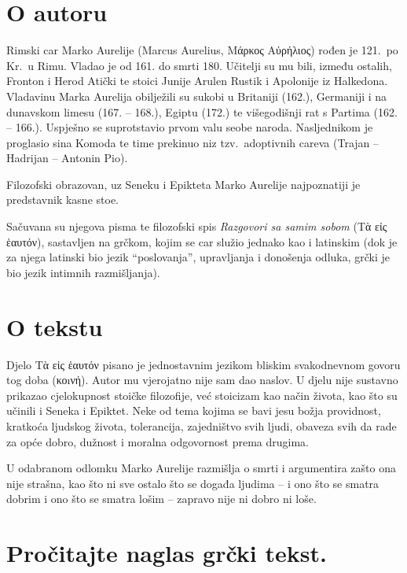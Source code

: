 \section*{O autoru}

Rimski car Marko Aurelije (Marcus Aurelius, \textgreek[variant=ancient]{Μάρκος Αὐρήλιος}) rođen je 121.\ po Kr.\ u Rimu. Vladao je od 161. do smrti 180. Učitelji su mu bili, između ostalih, Fronton i Herod Atički te stoici Junije Arulen Rustik i Apolonije iz Halkedona. Vladavinu Marka Aurelija obilježili su sukobi u Britaniji (162.), Germaniji i na dunavskom limesu (167. – 168.), Egiptu (172.) te višegodišnji rat s Partima (162. – 166.). Uspješno se suprotstavio prvom valu seobe naroda. Nasljednikom je proglasio sina Komoda te time prekinuo niz tzv.\ adoptivnih careva (Trajan – Hadrijan – Antonin Pio). 

Filozofski obrazovan, uz Seneku i Epikteta Marko Aurelije najpoznatiji je predstavnik kasne stoe.

Sačuvana su njegova pisma te filozofski spis \textit{Razgovori sa samim sobom} \textgreek[variant=ancient]{(Tὰ εἰς ἑαυτόν),} sastavljen na grčkom, kojim se car služio jednako kao i latinskim (dok je za njega latinski bio jezik ``poslovanja'', upravljanja i donošenja odluka, grčki je bio jezik intimnih razmišljanja).


\section*{O tekstu}

Djelo \textgreek[variant=ancient]{Tὰ εἰς ἑαυτόν} pisano je jednostavnim jezikom bliskim svakodnevnom govoru tog doba \textgreek[variant=ancient]{(κοıνή).} Autor mu vjerojatno nije sam dao naslov. U djelu nije sustavno prikazao cjelokupnost stoičke filozofije, već stoicizam kao način života, kao što su učinili i Seneka i Epiktet. Neke od tema kojima se bavi jesu božja providnost, kratkoća ljudskog života, tolerancija, zajedništvo svih ljudi, obaveza svih da rade za opće dobro, dužnost i moralna odgovornost prema drugima.

U odabranom odlomku Marko Aurelije razmišlja o smrti i argumentira zašto ona nije strašna, kao što ni sve ostalo što se događa ljudima – i ono što se smatra dobrim i ono što se smatra lošim – zapravo nije ni dobro ni loše.

\section*{Pročitajte naglas grčki tekst.}

